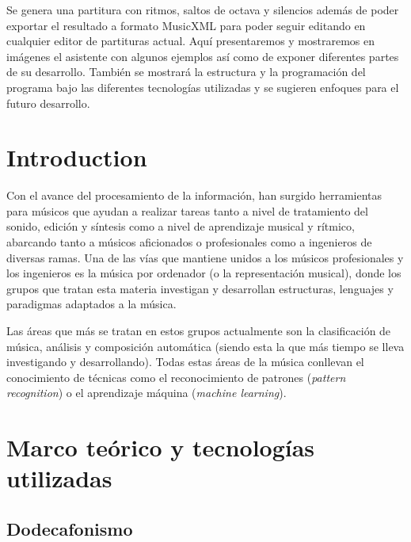 \documentclass[a4paper,openany,oneside,12pt]{book}
\begin{document}
Se genera una partitura con ritmos, saltos de octava y silencios además de poder exportar el resultado a formato MusicXML para poder seguir editando en cualquier editor de partituras actual. Aquí presentaremos y mostraremos en imágenes el asistente con algunos ejemplos así como de exponer diferentes partes de su desarrollo. También se mostrará la estructura y la programación del programa bajo las diferentes tecnologías utilizadas y se sugieren enfoques para el futuro desarrollo.



\newpage


\tableofcontents %

\cleardoublepage
{} %
\listoffigures %





\chapter{Introduction}
Con el avance del procesamiento de la información, han surgido herramientas para músicos que ayudan a realizar tareas tanto a nivel de tratamiento del sonido, edición y síntesis como a nivel de aprendizaje musical y rítmico, abarcando tanto a músicos aficionados o profesionales como a ingenieros de diversas ramas. Una de las vías que mantiene unidos a los músicos profesionales y los ingenieros es la música por ordenador (o la representación musical), donde los grupos que tratan esta materia investigan y desarrollan estructuras, lenguajes y paradigmas adaptados a la música.

Las áreas que más se tratan en estos grupos actualmente son la clasificación de música, análisis y composición automática (siendo esta la que más tiempo se lleva investigando y desarrollando). Todas estas áreas de la música conllevan el conocimiento de técnicas como el reconocimiento de patrones (\emph{pattern recognition}) o el aprendizaje máquina (\emph{machine learning}).

\chapter{Marco teórico y tecnologías utilizadas}\label{marcoteorico}
\section{Dodecafonismo}
\end{document}
